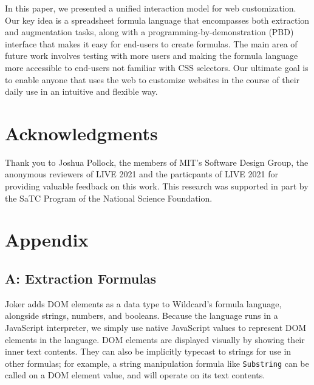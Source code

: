 \documentclass[sigconf,10pt]{acmart}
\begin{document}
In this paper, we presented a unified interaction model for web
customization. Our key idea is a spreadsheet formula language that
encompasses both extraction and augmentation tasks, along with a
programming-by-demonstration (PBD) interface that makes it easy for
end-users to create formulas. The main area of future work involves
testing with more users and making the formula language more accessible
to end-users not familiar with CSS selectors. Our ultimate goal is to
enable anyone that uses the web to customize websites in the course of
their daily use in an intuitive and flexible way.

\hypertarget{sec:acknowledgments}{%
\section{Acknowledgments}\label{sec:acknowledgments}}

Thank you to Joshua Pollock, the members of MIT's Software Design Group,
the anonymous reviewers of LIVE 2021 and the particpants of LIVE 2021
for providing valuable feedback on this work. This research was
supported in part by the SaTC Program of the National Science
Foundation.

\newpage

\clearpage





\clearpage
\hypertarget{appendix}{%
\section*{Appendix}\label{appendix}}

\hypertarget{appendix-a}{%
\subsection*{A: Extraction Formulas}\label{appendix-a}}

Joker adds DOM elements as a data type to Wildcard's formula language, alongside strings,
numbers, and booleans. Because the language runs in a JavaScript
interpreter, we simply use native JavaScript values to represent DOM
elements in the language. DOM elements are displayed visually by showing
their inner text contents. They can also be implicitly typecast to
strings for use in other formulas; for example, a string manipulation
formula like \texttt{Substring} can be called on a DOM element value,
and will operate on its text contents.
\end{document}
